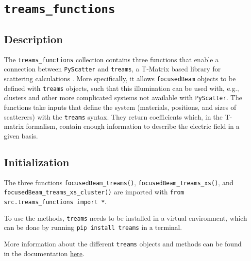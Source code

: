 \section{\texttt{treams\_functions}}

\subsection{Description}
The \texttt{treams\_functions} collection contains three functions that enable a connection between \texttt{PyScatter} and \texttt{treams}, a T-Matrix based library for scattering calculations \cite{treams}. 
More specifically, it allows \texttt{focusedBeam} objects to be defined with \texttt{treams} objects, such that this illumination can be used with, e.g., clusters and other more complicated systems not available with \texttt{PyScatter}.
The functions take inputs that define the system (materials, positions, and sizes of scatterers) with the \texttt{treams} syntax. They return coefficients which, in the T-matrix formalism, contain enough information to describe the electric field in a given basis.

\subsection{Initialization}
The three functions \texttt{focusedBeam\_treams()}, \texttt{focusedBeam\_treams\_xs()}, and \texttt{focusedBeam\_treams\_xs\_cluster()} are imported with \texttt{from src.treams\_functions import *}. \par
To use the methods, \texttt{treams} needs to be installed in a virtual environment, which can be done by running \texttt{pip install treams} in a terminal. \par
More information about the different \texttt{treams} objects and methods can be found in the documentation \href{https://tfp-photonics.github.io/treams/index.html}{here}.

